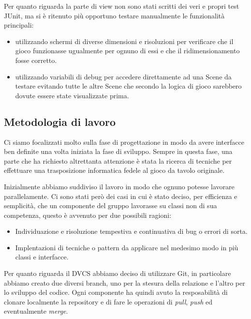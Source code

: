 Per quanto riguarda la parte di view non sono stati scritti dei veri e propri test JUnit, ma si è ritenuto più opportuno testare manualmente le funzionalità principali:
\begin{itemize}
    \item utilizzando schermi di diverse dimensioni e risoluzioni per verificare che il gioco funzionasse ugualmente per ognuno di essi e che il ridimensionamento fosse corretto.
    \item utilizzando variabili di debug per accedere direttamente ad una Scene da testare evitando tutte le altre Scene che secondo la logica di gioco sarebbero dovute essere state visualizzate prima.
\end{itemize}

\subsection{Metodologia di lavoro}
Ci siamo focalizzati molto sulla fase di progettazione in modo da avere interfacce ben definite una volta iniziata la fase di sviluppo. Sempre in questa fase, una parte che ha richiesto altrettanta attenzione è stata la ricerca di tecniche per effettuare una trasposizione informatica fedele al gioco da tavolo originale.
\medskip

Inizialmente abbiamo suddiviso il lavoro in modo che ognuno potesse lavorare parallelamente. Ci sono stati però dei casi in cui è stato deciso, per efficienza e semplicità, che un componente del gruppo lavorasse su classi non di sua competenza, questo è avvenuto per due possibili ragioni:
\begin{itemize}
    \item Individuazione e risoluzione tempestiva e continuativa di bug o errori di sorta.
    \item Implentazioni di tecniche o pattern da applicare nel medesimo modo in più classi e interfacce.
\end{itemize}

Per quanto riguarda il DVCS abbiamo deciso di utilizzare Git, in particolare abbiamo creato due diversi branch, uno per la stesura della relazione e l'altro per lo sviluppo del codice. Ogni componente ha quindi avuto la resposabilità di clonare localmente la repository e di fare le operazioni di \textit{pull}, \textit{push} ed eventualmente \textit{merge}.

